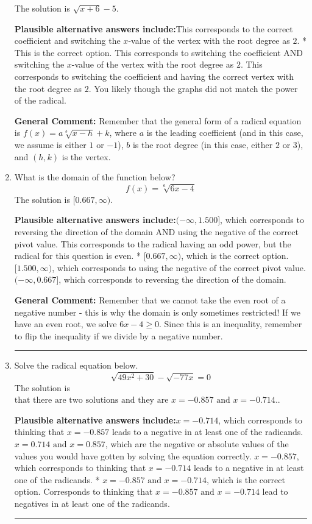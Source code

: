 \documentclass{extbook}[14pt]
\newcommand{\litem}[1]{\item #1

\rule{\textwidth}{0.4pt}}
\begin{document}
\begin{enumerate}
{The solution is \( \sqrt{x + 6} - 5 \).\begin{enumerate}[label=\Alph*.]
\textbf{Plausible alternative answers include:}This corresponds to the correct coefficient and switching the $x$-value of the vertex with the root degree as $2$.
* This is the correct option.
This corresponds to switching the coefficient AND switching the $x$-value of the vertex with the root degree as $2$.
This corresponds to switching the coefficient and having the correct vertex with the root degree as $2$.
You likely though the graphs did not match the power of the radical.
\end{enumerate}

\textbf{General Comment:} Remember that the general form of a radical equation is $ f(x) = a \sqrt[b]{x - h} + k$, where $a$ is the leading coefficient (and in this case, we assume is either $1$ or $-1$), $b$ is the root degree (in this case, either $2$ or $3$), and $(h, k)$ is the vertex.
}
\litem{
What is the domain of the function below?
\[ f(x) = \sqrt[6]{6 x - 4} \]The solution is \( [0.667, \infty) \).\begin{enumerate}[label=\Alph*.]
\textbf{Plausible alternative answers include:}$(-\infty, 1.500]$, which corresponds to reversing the direction of the domain AND using the negative of the correct pivot value.
This corresponds to the radical having an odd power, but the radical for this question is even.
* $[0.667, \infty)$, which is the correct option.
$[1.500, \infty)$, which corresponds to using the negative of the correct pivot value.
 $(-\infty, 0.667]$, which corresponds to reversing the direction of the domain.
\end{enumerate}

\textbf{General Comment:} Remember that we cannot take the even root of a negative number - this is why the domain is only sometimes restricted! If we have an even root, we solve $6 x - 4 \geq 0$. Since this is an inequality, remember to flip the inequality if we divide by a negative number.
}
\litem{
Solve the radical equation below.
\[ \sqrt{49 x^2 + 30} - \sqrt{-77 x} = 0 \]The solution is \( \text{that there are two solutions and they are } x = -0.857 \text{ and } x = -0.714. \).\begin{enumerate}[label=\Alph*.]
\textbf{Plausible alternative answers include:}$x = -0.714$, which corresponds to thinking that $x = -0.857$ leads to a negative in at least one of the radicands.
$x = 0.714 \text{ and } x = 0.857$, which are the negative or absolute values of the values you would have gotten by solving the equation correctly.
$x = -0.857$, which corresponds to thinking that $x = -0.714$ leads to a negative in at least one of the radicands.
* $x = -0.857 \text{ and } x = -0.714$, which is the correct option.
Corresponds to thinking that $x = -0.857 \text{ and } x = -0.714$ lead to negatives in at least one of the radicands.
\end{enumerate}

}
\end{enumerate}
\end{document}
